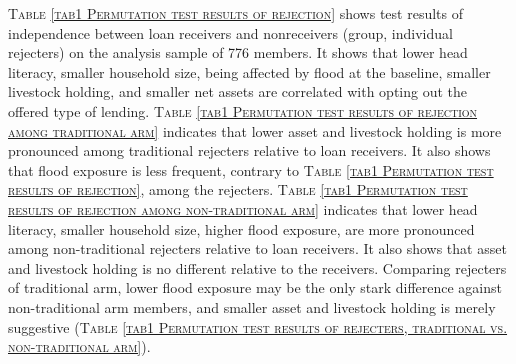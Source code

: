 
	\textsc{\normalsize Table \ref{tab1 Permutation test results of rejection}} shows test results of independence between loan receivers and nonreceivers (group, individual rejecters) on the analysis sample of 776 members. It shows that lower head literacy, smaller household size, being affected by flood at the baseline, smaller livestock holding, and smaller net assets are correlated with opting out the offered type of lending. \textsc{\normalsize Table \ref{tab1 Permutation test results of rejection among traditional arm}} indicates that lower asset and livestock holding is more pronounced among \textsf{traditional} rejecters relative to loan receivers. It also shows that flood exposure is less frequent, contrary to \textsc{\normalsize Table \ref{tab1 Permutation test results of rejection}}, among the rejecters. \textsc{\normalsize Table \ref{tab1 Permutation test results of rejection among non-traditional arm}} indicates that lower head literacy, smaller household size, higher flood exposure, are more pronounced among non-\textsf{traditional} rejecters relative to loan receivers. It also shows that asset and livestock holding is no different relative to the receivers. Comparing rejecters of \textsf{traditional} arm, lower flood exposure may be the only stark difference against non-\textsf{traditional} arm members, and smaller asset and livestock holding is merely suggestive (\textsc{\normalsize Table \ref{tab1 Permutation test results of rejecters, traditional vs. non-traditional arm}}). 
	
